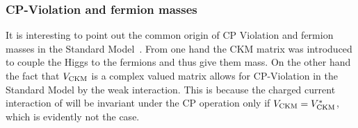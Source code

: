 \subsubsection{CP-Violation and fermion masses}
It is interesting to point out the common origin of CP Violation and fermion masses in the Standard Model~\cite{KM-mechanism}.
From one hand the CKM matrix was introduced to couple the Higgs to the fermions and thus give them mass.
On the other hand the fact that $V_{\rm CKM}$ is a complex valued matrix allows for CP-Violation in the
Standard Model by the weak interaction. This is because the charged current interaction of 
will be invariant under the CP operation only if $V_{\rm CKM}=V_{\rm CKM}^*$, which is evidently not the case.
